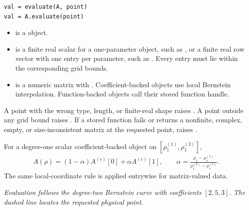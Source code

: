 \syntaxhead
\begin{lstlisting}[style=dpsyntax]
val = evaluate(A, point)
val = A.evaluate(point)
\end{lstlisting}

\arghead
\begin{itemize}[leftmargin=*]
  \item {} is a  object. \item {} is a finite real scalar for a one-parameter object, such as , or a finite real row vector with one entry per parameter, such as \code{[0.25 12]}.  Every entry must lie within the corresponding grid bounds. \item {} is a numeric matrix with .  Coefficient-backed objects use local Bernstein interpolation. Function-backed objects call their stored function handle.
\end{itemize}

\remarkshead
A point with the wrong type, length, or finite-real shape raises . A point outside any grid bound raises .  If a stored function fails or returns a nonfinite, complex, empty, or size-inconsistent matrix at the requested point,  raises \allowbreak{}.

For a degree-one scalar coefficient-backed object on $[\rho_1^{(1)},\rho_1^{(2)}]$,
\begin{gather*}
A(\rho) = (1-\alpha)A^{(c)}[0]+\alpha A^{(c)}[1],\qquad
  \alpha = \frac{\rho_1-\rho_1^{(1)}}
                 {\rho_1^{(2)}-\rho_1^{(1)}}.
\end{gather*}
The same local-coordinate rule is applied entrywise for matrix-valued data.

\begin{center}

\textit{Evaluation follows the degree-two Bernstein curve with coefficients $[2,5,3]$. The dashed line locates the requested physical point.}
\end{center}

